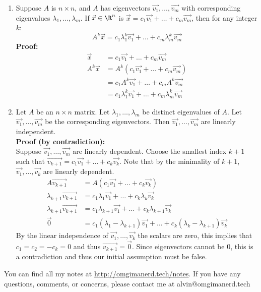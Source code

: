 \documentclass{math}
\begin{document}
\begin{enumerate}[Theorem 1.]
  \item Suppose \( A \) is \( n\times n \), and \( A \) has eigenvectors
  \( \vec{v_1},\dots,\vec{v_m} \) with corresponding eigenvalues \( \lambda_1,
  \dots,\lambda_m \). If \( \vec{x}\in\R^n \) is \( \vec{x} = c_1\vec{v_1}+
  \dots+c_m\vec{v_m} \), then for any integer \( k \):
  \[ A^k\vec{x} = c_1\lambda_1^k\vec{v_1}+\dots+c_m\lambda_m^k\vec{v_m} \]
  \textbf{Proof:}
  \begin{align*}
    \vec{x} &= c_1\vec{v_1}+\dots+c_m\vec{v_m} \\
    A^k\vec{x} &= A^k(c_1\vec{v_1}+\dots+c_m\vec{v_m}) \\
    &= c_1A^k\vec{v_1}+\dots+c_mA^k\vec{v_m} \\
    &= c_1\lambda_1^k\vec{v_1}+\dots+c_m\lambda_m^k\vec{v_m}
  \end{align*}
  \item Let \( A \) be an \( n\times n \) matrix. Let \( \lambda_1,\dots,
  \lambda_m \) be distinct eigenvalues of \( A \). Let \( \vec{v_1},\dots,
  \vec{v_m} \) be the corresponding eigenvectors. Then \( \vec{v_1},\dots,
  \vec{v_m} \) are linearly independent. \\
  \textbf{Proof (by contradiction):} \\
  Suppose \( \vec{v_1},\dots,\vec{v_m} \) are linearly dependent. Choose the
  smallest index \( k+1 \) such that \( \overrightarrow{v_{k+1}} =
  c_1\vec{v_1}+\dots+c_k\vec{v_k} \). Note that by the minimality of \( k+1 \),
  \( \vec{v_1}, \dots,\vec{v_k} \) are linearly dependent.
  \begin{align*}
    A\overrightarrow{v_{k+1}} &= A(c_1\vec{v_1}+\dots+c_k\vec{v_k}) \\
    \lambda_{k+1}\overrightarrow{v_{k+1}} &=
      c_1\lambda_1\vec{v_1}+\dots+c_k\lambda_k\vec{v_k} \\
    \lambda_{k+1}\overrightarrow{v_{k+1}} &= c_1\lambda_{k+1}\vec{v_1}+\dots+
      c_k\lambda_{k+1}\vec{v_k} \\
    \vec{0} &= c_1(\lambda_1-\lambda_{k+1})\vec{v_1}+\dots+
      c_k(\lambda_k-\lambda_{k+1})\vec{v_k}
  \end{align*}
  By the linear independence of \( \vec{v_1},\dots,\vec{v_k} \) the scalars
  are zero, this implies that \( c_1 = c_2 = -c_k = 0 \) and thus
  \( \overrightarrow{v_{k+1}} = \vec{0} \). Since eigenvectors cannot be 0,
  this is a contradiction and thus our initial assumption must be false.
\end{enumerate}

\begin{center}
  You can find all my notes at \url{http://omgimanerd.tech/notes}. If you have
  any questions, comments, or concerns, please contact me at
  alvin@omgimanerd.tech
\end{center}
\end{document}
